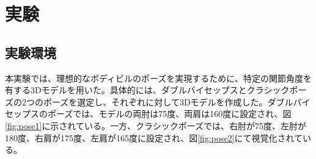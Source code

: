\chapter{実験}
\label{implementation}

\section{実験環境}
本実験では、理想的なボディビルのポーズを実現するために、特定の関節角度を有する3Dモデルを用いた。具体的には、ダブルバイセップスとクラシックポーズの2つのポーズを選定し、それぞれに対して3Dモデルを作成した。ダブルバイセップスのポーズでは、モデルの両肘は75度、両肩は160度に設定され、図\ref{fig:pose1}に示されている。一方、クラシックポーズでは、右肘が75度、左肘が180度、右肩が175度、左肩が165度に設定され、図\ref{fig:pose2}にて視覚化されている。

